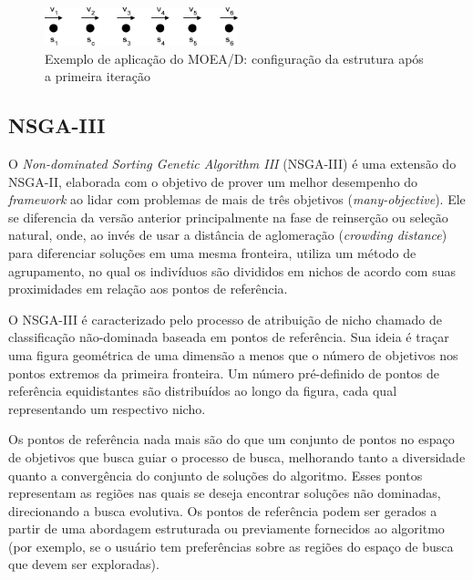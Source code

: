 \begin{figure}[!htbp]
	\centering
	\includegraphics[width=0.5\textwidth]{cap_otimizacao-multi/figs/moead-ex4}
	\caption{\label{fig_moead_ex4}Exemplo de aplicação do MOEA/D: configuração da estrutura após a primeira iteração}
\end{figure}

\FloatBarrier
\subsection{NSGA-III}

O \textit{Non-dominated Sorting Genetic Algorithm III} (NSGA-III) \cite{Deb2014} é uma extensão do NSGA-II, elaborada com o objetivo de prover um melhor desempenho do \textit{framework} ao lidar com problemas de mais de três objetivos (\textit{many-objective}). Ele se diferencia da versão anterior principalmente na fase de reinserção ou seleção natural, onde, ao invés de usar a distância de aglomeração (\textit{crowding distance}) para diferenciar soluções em uma mesma fronteira, utiliza um método de agrupamento, no qual os indivíduos são divididos em nichos de acordo com suas proximidades em relação aos pontos de referência.

O NSGA-III é caracterizado pelo processo de atribuição de nicho chamado de classificação não-dominada baseada em pontos de referência. Sua ideia é traçar uma figura geométrica de uma dimensão a menos que o número de objetivos nos pontos extremos da primeira fronteira. Um número pré-definido de pontos de referência equidistantes são distribuídos ao longo da figura, cada qual representando um respectivo nicho.

Os pontos de referência nada mais são do que um conjunto de pontos no espaço de objetivos que busca guiar o processo de busca, melhorando tanto a diversidade quanto a convergência do conjunto de soluções do algoritmo. Esses pontos representam as regiões nas quais se deseja encontrar soluções não dominadas, direcionando a busca evolutiva. Os pontos de referência podem ser gerados a partir de uma abordagem estruturada ou previamente fornecidos ao algoritmo (por exemplo, se o usuário tem preferências sobre as regiões do espaço de busca que devem ser exploradas). 

